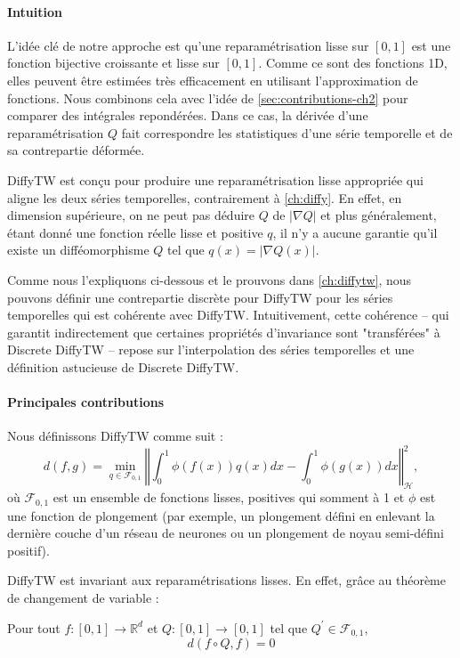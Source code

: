 \paragraph{Intuition}
L'idée clé de notre approche est qu'une reparamétrisation lisse sur $[0,1]$ est une fonction bijective croissante et lisse sur $[0,1]$. Comme ce sont des fonctions 1D, elles peuvent être estimées très efficacement en utilisant l'approximation de fonctions. Nous combinons cela avec l'idée de \cref{sec:contributions-ch2} pour comparer des intégrales repondérées. Dans ce cas, la dérivée d'une reparamétrisation $Q$ fait correspondre les statistiques d'une série temporelle et de sa contrepartie déformée.

DiffyTW est conçu pour produire une reparamétrisation lisse appropriée qui aligne les deux séries temporelles, contrairement à \cref{ch:diffy}. En effet, en dimension supérieure, on ne peut pas déduire $Q$ de $\vert \nabla Q\vert$ et plus généralement, étant donné une fonction réelle lisse et positive $q$, il n'y a aucune garantie qu'il existe un difféomorphisme $Q$ tel que $q(x) = \vert \nabla Q(x) \vert$.

Comme nous l'expliquons ci-dessous et le prouvons dans \cref{ch:diffytw}, nous pouvons définir une contrepartie discrète pour DiffyTW pour les séries temporelles qui est cohérente avec DiffyTW. Intuitivement, cette cohérence -- qui garantit indirectement que certaines propriétés d'invariance sont "transférées" à Discrete DiffyTW -- repose sur l'interpolation des séries temporelles et une définition astucieuse de Discrete DiffyTW.

\paragraph{Principales contributions}
Nous définissons DiffyTW comme suit :
\begin{equation*}
d(f, g) = \min_{q \in \mathcal F_{0,1}}\left\Vert \int_0^1 \phi(f(x))q(x)dx - \int_0^1\phi(g(x))dx\right\Vert^2_\mathcal H,
\end{equation*}
où $\mathcal F_{0,1}$ est un ensemble de fonctions lisses, positives qui somment à 1 et $\phi$ est une fonction de plongement (par exemple, un plongement défini en enlevant la dernière couche d'un réseau de neurones ou un plongement de noyau semi-défini positif).

DiffyTW est invariant aux reparamétrisations lisses. En effet, grâce au théorème de changement de variable :
\begin{mdframed}
\begin{informaltheorem}
Pour tout $f:[0,1] \to\mathbb R^d$ et $Q:[0,1]\to[0,1]$ tel que $Q^\prime \in\mathcal F_{0,1}$,
\begin{equation*}
d(f\circ Q, f) = 0
\end{equation*}
\end{informaltheorem}
\end{mdframed}

